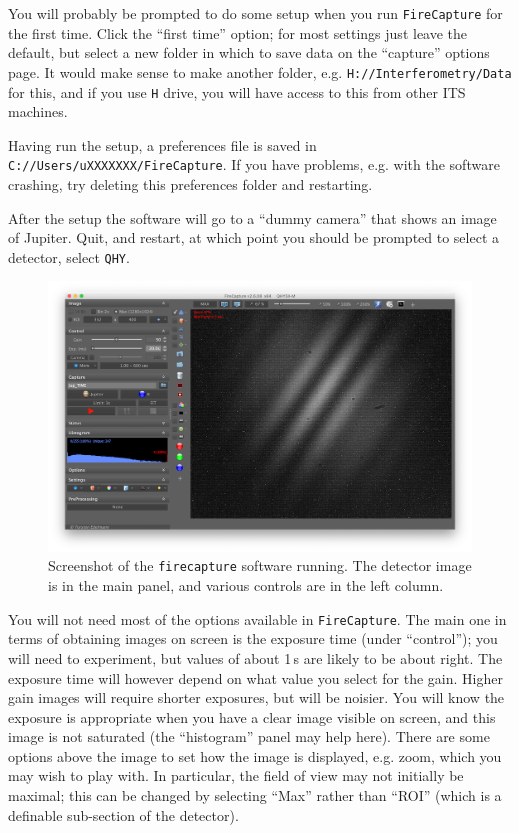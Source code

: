 \documentclass[11pt]{article}
\begin{document}
You will probably be prompted to do some setup when you run \texttt{FireCapture} for the first time. Click the ``first time'' option; for most settings just leave the default, but select a new folder in which to save data on the ``capture'' options page. It would make sense to make another folder, e.g. \texttt{H://Interferometry/Data} for this, and if you use \texttt{H} drive, you will have access to this from other ITS machines.

Having run the setup, a preferences file is saved in \texttt{C://Users/uXXXXXXX/FireCapture}. If you have problems, e.g. with the software crashing, try deleting this preferences folder and restarting.

After the setup the software will go to a ``dummy camera'' that shows an image of Jupiter. Quit, and restart, at which point you should be prompted to select a detector, select \texttt{QHY}.

\begin{figure}[h]
    \centering
    \includegraphics[width=1\textwidth]{doc/fc.png}
    \caption{Screenshot of the \texttt{firecapture} software running. The detector image is in the main panel, and various controls are in the left column.}
    \label{fig:fc}
\end{figure}

You will not need most of the options available in \texttt{FireCapture}. The main one in terms of obtaining images on screen is the exposure time (under ``control''); you will need to experiment, but values of about 1\,s are likely to be about right. The exposure time will however depend on what value you select for the gain. Higher gain images will require shorter exposures, but will be noisier. You will know the exposure is appropriate when you have a clear image visible on screen, and this image is not saturated (the ``histogram'' panel may help here). There are some options above the image to set how the image is displayed, e.g. zoom, which you may wish to play with. In particular, the field of view may not initially be maximal; this can be changed by selecting ``Max'' rather than ``ROI'' (which is a definable sub-section of the detector).
\end{document}

